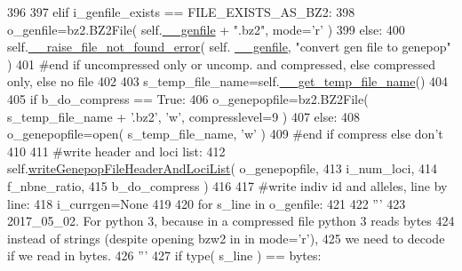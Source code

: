 \begin{DoxyCode}
396 
397         \textcolor{keywordflow}{elif} i\_genfile\_exists == FILE\_EXISTS\_AS\_BZ2:
398             o\_genfile=bz2.BZ2File( self.\hyperlink{classnegui_1_1pgoutputsimupop_1_1PGOutputSimuPop_a30fb6b94af13efad6becfbe6fddc1d95}{\_\_genfile} + \textcolor{stringliteral}{".bz2"}, mode=\textcolor{stringliteral}{'r' )}
399 \textcolor{stringliteral}{        }\textcolor{keywordflow}{else}:
400             self.\hyperlink{classnegui_1_1pgoutputsimupop_1_1PGOutputSimuPop_abf6aab4f7982c2b0f9e4544343bf241b}{\_\_raise\_file\_not\_found\_error}( self.
      \hyperlink{classnegui_1_1pgoutputsimupop_1_1PGOutputSimuPop_a30fb6b94af13efad6becfbe6fddc1d95}{\_\_genfile}, \textcolor{stringliteral}{"convert gen file to genepop"} )
401         \textcolor{comment}{#end if uncompressed only or uncomp. and compressed, else compressed only, else no file}
402 
403         s\_temp\_file\_name=self.\hyperlink{classnegui_1_1pgoutputsimupop_1_1PGOutputSimuPop_a719984e6f178fb39b6ab349674251738}{\_\_get\_temp\_file\_name}()
404 
405         \textcolor{keywordflow}{if} b\_do\_compress == \textcolor{keyword}{True}:
406             o\_genepopfile=bz2.BZ2File( s\_temp\_file\_name + \textcolor{stringliteral}{'.bz2'}, \textcolor{stringliteral}{'w'}, compresslevel=9 ) 
407         \textcolor{keywordflow}{else}:
408             o\_genepopfile=open( s\_temp\_file\_name, \textcolor{stringliteral}{'w'} )
409         \textcolor{comment}{#end if compress else don't}
410 
411         \textcolor{comment}{#write header and loci list:}
412         self.\hyperlink{classnegui_1_1pgoutputsimupop_1_1PGOutputSimuPop_a99bc161de61efea5751a230b9b4c9950}{writeGenepopFileHeaderAndLociList}( o\_genepopfile, 
413                                                     i\_num\_loci, 
414                                                     f\_nbne\_ratio, 
415                                                     b\_do\_compress )
416         
417         \textcolor{comment}{#write indiv id and alleles, line by line:}
418         i\_currgen=\textcolor{keywordtype}{None}
419 
420         \textcolor{keywordflow}{for} s\_line \textcolor{keywordflow}{in} o\_genfile:
421 
422             \textcolor{stringliteral}{'''}
423 \textcolor{stringliteral}{            2017\_05\_02.  For python 3, because in a compressed file python 3 reads bytes}
424 \textcolor{stringliteral}{            instead of strings (despite opening bzw2 in in mode='r'), }
425 \textcolor{stringliteral}{            we need to decode }\textcolor{keywordflow}{if} we read \textcolor{keywordflow}{in} bytes.
426             \textcolor{stringliteral}{'''}
427 \textcolor{stringliteral}{            if type( s\_line ) == bytes:}

\end{DoxyCode}
